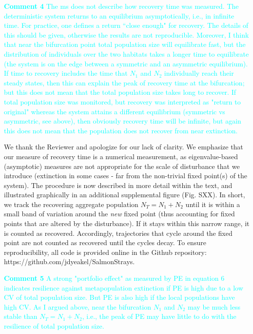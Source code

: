 \documentclass[ucm,12pt]{ucletter}
\begin{document}
\begin{letter}
\noindent \textcolor{cyan}{
{\bf Comment 4} The ms does not describe how recovery time was measured. The deterministic system returns to an equilibrium asymptotically, i.e., in infinite time. For practice, one defines a return ``close enough" for recovery. The details of this should be given, otherwise the results are not reproducible. Moreover, I think that near the bifurcation point total population size will equilibrate fast, but the distribution of individuals over the two habitats takes a longer time to equilibrate (the system is on the edge between a symmetric and an asymmetric equilibrium). If time to recovery includes the time that $N_1$ and $N_2$ individually reach their steady states, then this can explain the peak of recovery time at the bifurcation; but this does not mean that the total population size takes long to recover. If total population size was monitored, but recovery was interpreted as "return to original" whereas the system attains a different equilibrium (symmetric vs asymmetric, see above), then obviously recovery time will be infinite, but again this does not mean that the population does not recover from near extinction.
}

 We thank the Reviewer and apologize for our lack of clarity. We emphasize that our measure of recovery time is a numerical measurement, as eigenvalue-based (asymptotic) measures are not appropriate for the scale of disturbance that we introduce (extinction in some cases - far from the non-trivial fixed point(s) of the system). The procedure is now described in more detail within the text, and illustrated graphically in an additional supplemental figure (Fig. SXX). In short, we track the recovering aggregate population $N_T=N_1+N_2$ until it is within a small band of variation around the \emph{new} fixed point (thus accounting for fixed points that are altered by the disturbance). If it stays within this narrow range, it is counted as recovered. Accordingly, trajectories that cycle around the fixed point are not counted as recovered until the cycles decay. To ensure reproducibility, all code is provided online in the Github repository: https://github.com/jdyeakel/SalmonStrays.

\noindent \textcolor{cyan}{
{\bf Comment 5} A strong "portfolio effect" as measured by PE in equation 6 indicates resilience against metapopulation extinction if PE is high due to a low CV of total population size. But PE is also high if the local populations have high CV. As I argued above, near the bifurcation $N_1$ and $N_2$ may be much less stable than $N_T=N_1+N_2$, i.e., the peak of PE may have little to do with the resilience of total population size.
}


\end{letter}
\end{document}
